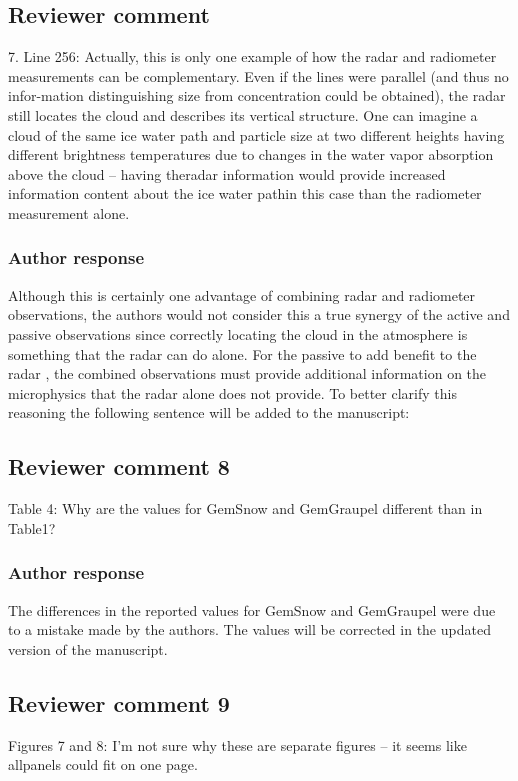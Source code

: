 \documentclass[11pt]{scrartcl}
\begin{document}
\subsection{Reviewer comment}
7.  Line 256:  Actually, this is only one example of how the radar and radiometer measurements can be complementary.  Even if the lines were parallel (and thus no infor-mation distinguishing size from concentration could be obtained), the radar still locates the cloud and describes its vertical structure.  One can imagine a cloud of the same ice water path and particle size at two different heights having different brightness temperatures due to changes in the water vapor absorption above the cloud – having theradar information would provide increased information content about the ice water pathin this case than the radiometer measurement alone.

\subsubsection*{Author response}
Although this is certainly one advantage of combining radar and radiometer
observations, the authors would not consider this a true synergy of the active
and passive observations since correctly locating the cloud in the atmosphere is
something that the radar can do alone. For the passive to add benefit to the
radar , the combined observations must provide additional information on the
microphysics that the radar alone does not provide. To better clarify this
reasoning the following sentence will be added to the manuscript:

\subsection*{Reviewer comment 8}
Table 4: Why are the values for GemSnow and GemGraupel different than in Table1?

\subsubsection*{Author response}

The differences in the reported values for GemSnow and GemGraupel were due to a mistake
made by the authors. The values will be corrected in the updated version of the manuscript.

\subsection*{Reviewer comment 9}
Figures 7 and 8:  I’m not sure why these are separate figures – it seems like allpanels could fit on one page.
\end{document}
